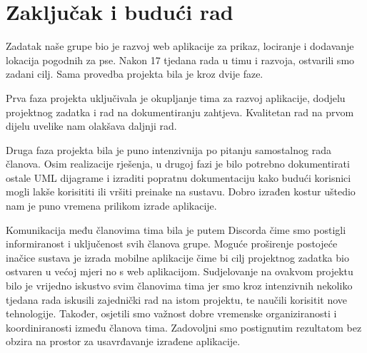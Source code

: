 \chapter{Zaključak i budući rad}
		
		

        Zadatak naše grupe bio je razvoj web aplikacije za prikaz, lociranje i dodavanje lokacija pogodnih za pse. Nakon 17 tjedana rada u timu i razvoja, ostvarili smo zadani cilj. Sama provedba projekta bila je kroz dvije faze.

        Prva faza projekta uključivala je okupljanje tima za razvoj aplikacije, dodjelu projektnog zadatka i rad na dokumentiranju zahtjeva. Kvalitetan rad na prvom dijelu uvelike nam olakšava daljnji rad. 
        
        Druga faza projekta bila je puno intenzivnija po pitanju samostalnog rada članova. Osim realizacije rješenja, u drugoj fazi je bilo potrebno dokumentirati ostale UML dijagrame i izraditi popratnu dokumentaciju kako budući korisnici mogli lakše korisititi ili vršiti preinake na sustavu. Dobro izrađen kostur uštedio nam je puno vremena prilikom izrade aplikacije.
        
        Komunikacija među članovima tima bila je putem Discorda čime smo postigli informiranost i uključenost svih članova grupe. Moguće proširenje postojeće inačice sustava je izrada mobilne aplikacije čime bi cilj projektnog zadatka bio ostvaren u većoj mjeri no s web aplikacijom.
        Sudjelovanje na ovakvom projektu bilo je vrijedno iskustvo svim članovima tima jer smo kroz intenzivnih nekoliko tjedana rada iskusili zajednički rad na istom projektu, te naučili korisitit nove tehnologije. Također, osjetili smo važnost dobre vremenske organiziranosti i koordiniranosti između članova tima. Zadovoljni smo postignutim rezultatom bez obzira na prostor za usavrđavanje izrađene aplikacije.
		
		\eject 